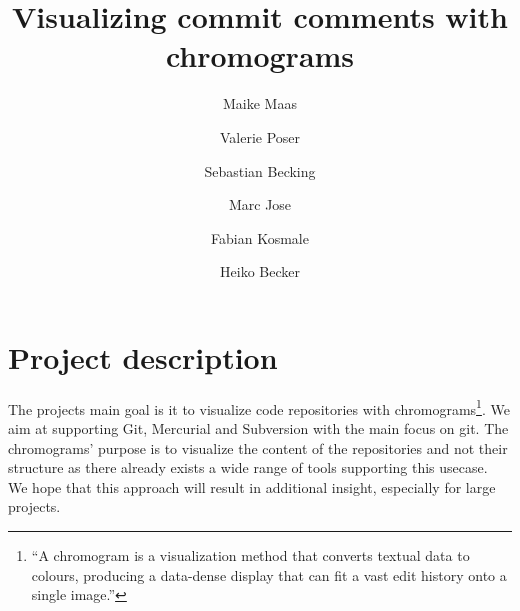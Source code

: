 \documentclass[12pt]{scrartcl}
\author{Maike Maas \and Valerie Poser \and Sebastian Becking
\and Marc Jose \and Fabian Kosmale  \and Heiko Becker}
\title{Visualizing commit comments with chromograms}
\begin{document}
\maketitle
\section{Project description}
The projects main goal is it to visualize code repositories with
chromograms\footnote{\enquote{A chromogram is a visualization method that
converts textual data to colours, producing a data-dense display that can fit a
vast edit history onto a single image.}\cite{wattenberg2007}}.
We aim at supporting Git, Mercurial and Subversion with the main focus on git.
The chromograms' purpose is to visualize the content of the repositories and
not their structure as 
there already exists a wide range of tools supporting this usecase.\\
We hope that
this approach will result in additional insight, especially for large projects.
\end{document}
